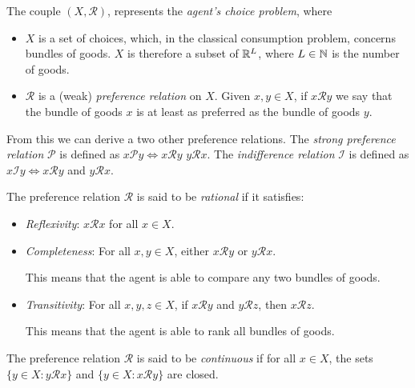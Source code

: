 \documentclass[twoside, titlepage]{article}
\begin{document}
The couple $(X, \mathcal{R})$, represents the \textit{agent's choice problem}, where
\begin{itemize}
    \item $X$ is a set of choices, which, in the classical consumption problem, concerns bundles of goods. $X$ is therefore a subset of $\mathbb{R}^L$, where $L \in \mathbb{N}$ is the number of goods.
    \item $\mathcal{R}$ is a (weak) \textit{preference relation} on $X$. Given $x,y \in X$, if $x \mathcal{R} y$ we say that the bundle of goods $x$ is at least as preferred as the bundle of goods $y$.
\end{itemize}

From this we can derive a two other preference relations. The \textit{strong preference relation} $\mathcal{P}$ is defined as $x \mathcal{P} y \iff x \mathcal{R} y$  $y \mathcal{R} x$. The \textit{indifference relation} $\mathcal{I}$ is defined as $x \mathcal{I} y \iff x \mathcal{R} y $ and $y \mathcal{R} x$.

\begin{assumption}[Rationality] \label{ass:rationality}
    The preference relation $\mathcal{R}$ is said to be \textit{rational} if it satisfies:
    \begin{itemize}
        \item \textit{Reflexivity}: $x \mathcal{R} x$ for all $x \in X$.
        \item \textit{Completeness}: For all $x, y \in X$, either $x \mathcal{R} y$ or $y \mathcal{R} x$.
        \begin{explanation}
            This means that the agent is able to compare any two bundles of goods.
        \end{explanation}
        \item \textit{Transitivity}: For all $x, y, z \in X$, if $x \mathcal{R} y$ and $y \mathcal{R} z$, then $x \mathcal{R} z$.
        \begin{explanation}
            This means that the agent is able to rank all bundles of goods.
        \end{explanation}
    \end{itemize}
\end{assumption}

\begin{assumption}[Continuity] \label{ass:continuity}
    The preference relation $\mathcal{R}$ is said to be \textit{continuous} if for all $x \in X$, the sets $\{y \in X : y \mathcal{R} x\}$ and $\{y \in X : x \mathcal{R} y\}$ are closed.
\end{assumption}
\end{document}
